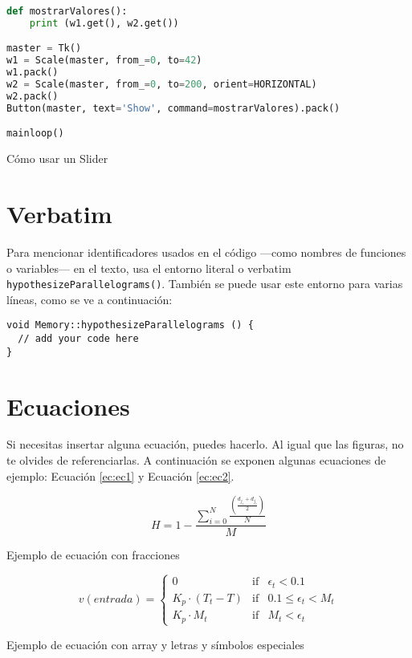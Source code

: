 \begin{code}[h]
\begin{lstlisting}[language=Python]
def mostrarValores():
    print (w1.get(), w2.get())

master = Tk()
w1 = Scale(master, from_=0, to=42)
w1.pack()
w2 = Scale(master, from_=0, to=200, orient=HORIZONTAL)
w2.pack()
Button(master, text='Show', command=mostrarValores).pack()

mainloop()
\end{lstlisting}
\caption[Cómo usar un Slider]{Cómo usar un Slider}
\label{cod:codejemplo2}
\end{code}

\section{Verbatim}

Para mencionar identificadores usados en el código ---como nombres de funciones o variables--- en el texto, usa el entorno literal o verbatim \verb|hypothesizeParallelograms()|. También se puede usar este entorno para varias líneas, como se ve a continuación:

\begin{verbatim}
void Memory::hypothesizeParallelograms () {
  // add your code here
}
\end{verbatim}

\section{Ecuaciones}

Si necesitas insertar alguna ecuación, puedes hacerlo. Al igual que las figuras, no te olvides de referenciarlas. A continuación se exponen algunas ecuaciones de ejemplo: Ecuación \ref{ec:ec1} y Ecuación \ref{ec:ec2}.

\begin{myequation}[h]
\begin{equation}
H = 1 - \frac{\sum_{i=0}^{N}\frac{(\frac{d_{j_s} + d_{j_e}}{2})}{N}}{M}
\nonumber
\label{ec:ec1}
\end{equation}
\caption[Ejemplo de ecuación con fracciones]{Ejemplo de ecuación con fracciones}
\end{myequation} 

\begin{myequation}[h]
\begin{equation}
v(entrada)= \left\{
	\begin{array}{lcc}
		0 & \mbox{if} & \epsilon_t < 0.1\\
		K_p\cdot{(T_{t}-T)} & \mbox{if}& 0.1 \leq \epsilon_t < M_t\\
		K_p \cdot M_t & \mbox{if}& M_t < \epsilon_t
	\end{array}
\right.
\label{ec:ec2}
\end{equation}
\caption[Ejemplo de ecuación con array y letras y símbolos especiales]{Ejemplo de ecuación con array y letras y símbolos especiales}
\end{myequation}

